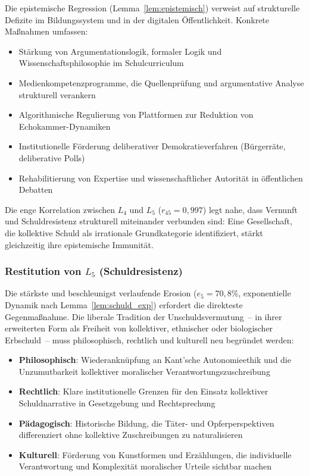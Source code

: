 ﻿\documentclass[a4paper,12pt]{article}
\theoremstyle{definition}
\begin{document}
Die epistemische Regression (Lemma~\ref{lem:epistemisch}) verweist auf strukturelle Defizite im Bildungssystem und in der digitalen Öffentlichkeit. Konkrete Maßnahmen umfassen:
\begin{itemize}
	\item Stärkung von Argumentationslogik, formaler Logik und Wissenschaftsphilosophie im Schulcurriculum
	\item Medienkompetenzprogramme, die Quellenprüfung und argumentative Analyse strukturell verankern
	\item Algorithmische Regulierung von Plattformen zur Reduktion von Echokammer-Dynamiken
	\item Institutionelle Förderung deliberativer Demokratieverfahren (Bürgerräte, deliberative Polls)
	\item Rehabilitierung von Expertise und wissenschaftlicher Autorität in öffentlichen Debatten
\end{itemize}
Die enge Korrelation zwischen $L_4$ und $L_5$ ($r_{45} = 0{,}997$) legt nahe, dass Vernunft und Schuldresistenz strukturell miteinander verbunden sind: Eine Gesellschaft, die kollektive Schuld als irrationale Grundkategorie identifiziert, stärkt gleichzeitig ihre epistemische Immunität.

\subsubsection{Restitution von $L_5$ (Schuldresistenz)}

Die stärkste und beschleunigst verlaufende Erosion ($e_5 = 70{,}8\%$, exponentielle Dynamik nach Lemma~\ref{lem:schuld_exp}) erfordert die direkteste Gegenmaßnahme. Die liberale Tradition der Unschuldsvermutung~-- in ihrer erweiterten Form als Freiheit von kollektiver, ethnischer oder biologischer Erbschuld~-- muss philosophisch, rechtlich und kulturell neu begründet werden:

\begin{itemize}
	\item \textbf{Philosophisch}: Wiederanknüpfung an Kant'sche Autonomieethik und die Unzumutbarkeit kollektiver moralischer Verantwortungszuschreibung
	\item \textbf{Rechtlich}: Klare institutionelle Grenzen für den Einsatz kollektiver Schuldnarrative in Gesetzgebung und Rechtsprechung
	\item \textbf{Pädagogisch}: Historische Bildung, die Täter- und Opferperspektiven differenziert ohne kollektive Zuschreibungen zu naturalisieren
	\item \textbf{Kulturell}: Förderung von Kunstformen und Erzählungen, die individuelle Verantwortung und Komplexität moralischer Urteile sichtbar machen
\end{itemize}
\end{document}
